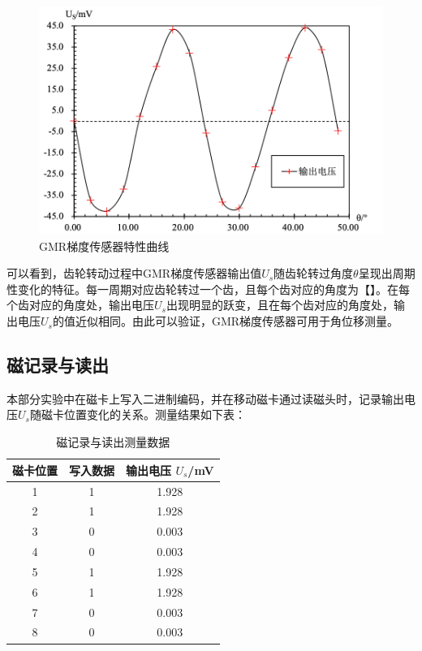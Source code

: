 \documentclass{thuemp}
\begin{document}
\begin{figure}[H]
    \centering
    \includegraphics[width=0.9\linewidth]{../Data/GMR-Plot-05-excel.png}
    \caption{GMR梯度传感器特性曲线} \label{fig:gmr_gradient}
\end{figure}

可以看到，齿轮转动过程中GMR梯度传感器输出值$U_s$随齿轮转过角度$\theta$呈现出周期性变化的特征。每一周期对应齿轮转过一个齿，且每个齿对应的角度为【】。在每个齿对应的角度处，输出电压$U_s$出现明显的跃变，且在每个齿对应的角度处，输出电压$U_s$的值近似相同。由此可以验证，GMR梯度传感器可用于角位移测量。

\subsection{磁记录与读出}

本部分实验中在磁卡上写入二进制编码，并在移动磁卡通过读磁头时，记录输出电压$U_s$随磁卡位置变化的关系。测量结果如下表：

\begin{table}[H]
    \centering
    \captionnamefont{\wuhao\bf\heiti}
    \captiontitlefont{\wuhao\bf\heiti}
    \caption{磁记录与读出测量数据} \label{tab:magnetic_record}
    \liuhao
    \begin{tabular}{ccc}
        \toprule
        磁卡位置 & 写入数据& 输出电压 $U_s$/\si{\milli\volt} \\
        \midrule
        1 & 1 & 1.928 \\ 
        2 & 1 & 1.928 \\ 
        3 & 0 & 0.003 \\ 
        4 & 0 & 0.003 \\ 
        5 & 1 & 1.928 \\ 
        6 & 1 & 1.928 \\ 
        7 & 0 & 0.003 \\ 
        8 & 0 & 0.003 \\ 
        \bottomrule
    \end{tabular}
\end{table}
\end{document}
